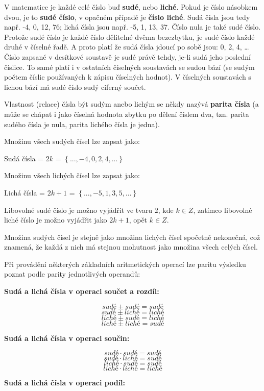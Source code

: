 V matematice je každé celé číslo buď {\bf sudé}, nebo {\bf liché}. Pokud je číslo násobkem dvou, je to {\bf sudé číslo}, v opačném případě je {\bf číslo liché}. Sudá čísla jsou tedy např. -4, 0, 12, 76; lichá čísla jsou např. -5, 1, 13, 37. Číslo nula je také sudé číslo. Protože sudé číslo je každé číslo dělitelné dvěma bezezbytku, je sudé číslo každé druhé v číselné řadě. A proto platí že sudá čísla jdoucí po sobě jsou: 0, 2, 4, … Číslo zapsané v desítkové soustavě je sudé právě tehdy, je-li sudá jeho poslední číslice. To samé platí i v ostatních číselných soustavách se sudou bází (se sudým počtem číslic používaných k zápisu číselných hodnot). V číselných soustavách s lichou bází má sudé číslo sudý ciferný součet.

Vlastnost (relace) čísla být sudým anebo lichým se někdy nazývá {\bf parita čísla} (a může se chápat i jako číselná hodnota zbytku po dělení číslem dva, tzn. parita sudého čísla je nula, parita lichého čísla je jedna).

Množinu všech sudých čísel lze zapsat jako:

Sudá čísla = $2k$ = $\left\{..., -4, 0,2,4,... \right\}$

Množinu všech lichých čísel lze zapsat jako:

Lichá čísla = $2k+1$ = $\left\{..., -5, 1,3,5,... \right\}$

Libovolné sudé číslo je možno vyjádřit ve tvaru $2$, kde $k\in Z$, zatímco libovolné liché číslo je možno vyjádřit jako $2k + 1$, opět $k\in Z$.

Množina sudých čísel je stejně jako množina lichých čísel spočetně nekonečná, což znamená, že každá z nich má stejnou mohutnost jako množina všech celých čísel.



Při provádění některých základních aritmetických operací lze paritu výsledku poznat podle parity jednotlivých operandů:

{\bf Sudá a lichá čísla v operaci součet a rozdíl:}

$$ sudé \pm sudé = sudé $$
$$ sudé \pm liché = liché $$
$$ liché \pm sudé = liché $$
$$ liché \pm liché = sudé $$


{\bf Sudá a lichá čísla v operaci součin:}

$$ sudé \cdot sudé = sudé $$
$$ sudé \cdot liché = sudé $$
$$ liché \cdot sudé = sudé $$
$$ liché \cdot liché = liché $$

{\bf Sudá a lichá čísla v operaci podíl:}

